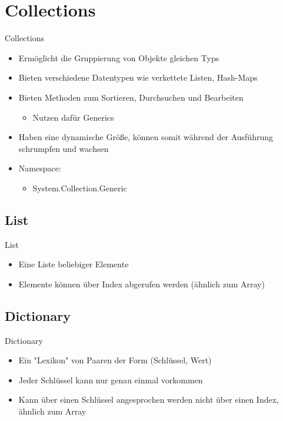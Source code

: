 \section{Collections}
\begin{frame}{Collections}
	\begin{itemize}
		\item Ermöglicht die Gruppierung von Objekte gleichen Typs
		\item Bieten verschiedene Datentypen wie verkettete Listen, Hash-Maps
		\item Bieten Methoden zum Sortieren, Durchsuchen und Bearbeiten
		\begin{itemize}
			\item Nutzen dafür Generics
		\end{itemize}
		\item Haben eine dynamische Größe, können somit während der Ausführung schrumpfen und wachsen
		\item Namespace:
		\begin{itemize}			
			\item \alert{System.Collection.Generic}
		\end{itemize}
	\end{itemize}
\end{frame}

\subsection{List}
\begin{frame}{List}
	\begin{itemize}
		\item Eine Liste beliebiger Elemente
		\item Elemente können über Index abgerufen werden (ähnlich zum Array)
	\end{itemize}
	
\end{frame}

\subsection{Dictionary}
\begin{frame}{Dictionary}
	\begin{itemize}
		\item Ein "Lexikon" von Paaren der Form (Schlüssel, Wert)
		\item Jeder Schlüssel kann nur genau einmal vorkommen
		\item Kann über einen Schlüssel angesprochen werden nicht über einen Index, ähnlich zum Array
	\end{itemize}
	
\end{frame}

